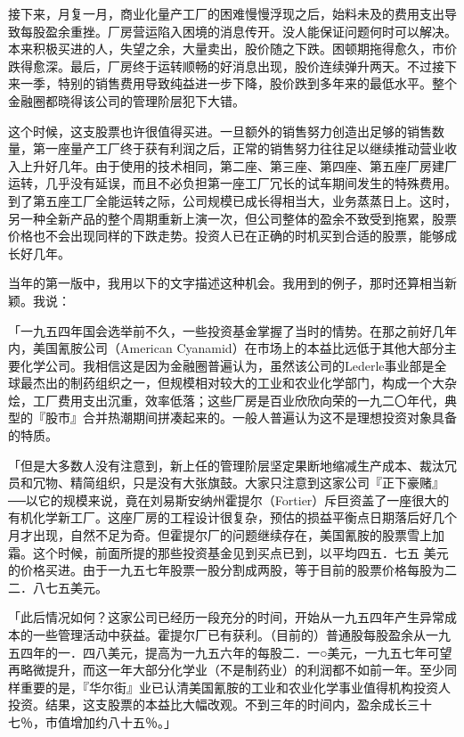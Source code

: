 \documentclass[UTF8,a4paper,zihao=-4,fontset = windows]{ctexart} %
\begin{document}
接下来，月复一月，商业化量产工厂的困难慢慢浮现之后，始料未及的费用支出导致每股盈余重挫。厂房营运陷入困境的消息传开。没人能保证问题何时可以解决。本来积极买进的人，失望之余，大量卖出，股价随之下跌。困顿期拖得愈久，市价跌得愈深。最后，厂房终于运转顺畅的好消息出现，股价连续弹升两天。不过接下来一季，特别的销售费用导致纯益进一步下降，股价跌到多年来的最低水平。整个金融圈都晓得该公司的管理阶层犯下大错。

这个时候，这支股票也许很值得买进。一旦额外的销售努力创造出足够的销售数量，第一座量产工厂终于获有利润之后，正常的销售努力往往足以继续推动营业收入上升好几年。由于使用的技术相同，第二座、第三座、第四座、第五座厂房建厂运转，几乎没有延误，而且不必负担第一座工厂冗长的试车期间发生的特殊费用。到了第五座工厂全能运转之际，公司规模已成长得相当大，业务蒸蒸日上。这时，另一种全新产品的整个周期重新上演一次，但公司整体的盈余不致受到拖累，股票价格也不会出现同样的下跌走势。投资人已在正确的时机买到合适的股票，能够成长好几年。

当年的第一版中，我用以下的文字描述这种机会。我用到的例子，那时还算相当新颖。我说：


「一九五四年国会选举前不久，一些投资基金掌握了当时的情势。在那之前好几年内，美国氰胺公司（American Cyanamid）在市场上的本益比远低于其他大部分主要化学公司。我相信这是因为金融圈普遍认为，虽然该公司的Lederle事业部是全球最杰出的制药组织之一，但规模相对较大的工业和农业化学部门，构成一个大杂烩，工厂费用支出沉重，效率低落；这些厂房是百业欣欣向荣的一九二〇年代，典型的『股市』合并热潮期间拼凑起来的。一般人普遍认为这不是理想投资对象具备的特质。

「但是大多数人没有注意到，新上任的管理阶层坚定果断地缩减生产成本、裁汰冗员和冗物、精简组织，只是没有大张旗鼓。大家只注意到这家公司『正下豪赌』──以它的规模来说，竟在刘易斯安纳州霍提尔（Fortier）斥巨资盖了一座很大的有机化学新工厂。这座厂房的工程设计很复杂，预估的损益平衡点日期落后好几个月才出现，自然不足为奇。但霍提尔厂的问题继续存在，美国氰胺的股票雪上加霜。这个时候，前面所提的那些投资基金见到买点已到，以平均四五．七五
美元的价格买进。由于一九五七年股票一股分割成两股，等于目前的股票价格每股为二二．八七五美元。

「此后情况如何？这家公司已经历一段充分的时间，开始从一九五四年产生异常成本的一些管理活动中获益。霍提尔厂已有获利。（目前的）普通股每股盈余从一九五四年的一．四八美元，提高为一九五六年的每股二．一○美元，一九五七年可望再略微提升，而这一年大部分化学业（不是制药业）的利润都不如前一年。至少同样重要的是，『华尔街』业已认清美国氰胺的工业和农业化学事业值得机构投资人投资。结果，这支股票的本益比大幅改观。不到三年的时间内，盈余成长三十七％，市值增加约八十五％。」
\end{document}
